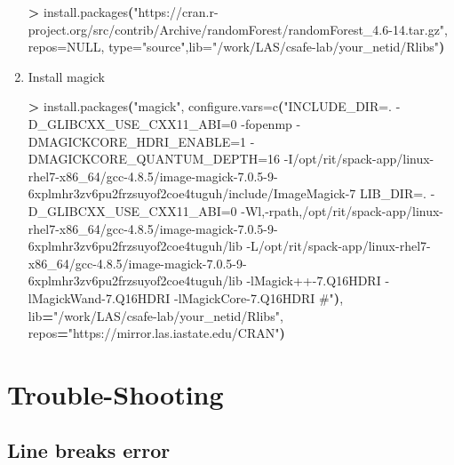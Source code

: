 \documentclass[
]{book}
\newenvironment{Shaded}{\begin{snugshade}}{\end{snugshade}}
\newcommand{\ErrorTok}[1]{\textcolor[rgb]{0.64,0.00,0.00}{\textbf{#1}}}
\newcommand{\ExtensionTok}[1]{#1}
\newcommand{\KeywordTok}[1]{\textcolor[rgb]{0.13,0.29,0.53}{\textbf{#1}}}
\newcommand{\NormalTok}[1]{#1}
\newcommand{\OperatorTok}[1]{\textcolor[rgb]{0.81,0.36,0.00}{\textbf{#1}}}
\newcommand{\StringTok}[1]{\textcolor[rgb]{0.31,0.60,0.02}{#1}}
\newcommand{\VariableTok}[1]{\textcolor[rgb]{0.00,0.00,0.00}{#1}}
\begin{document}
\begin{enumerate}
\begin{Shaded}
\begin{Highlighting}[]
\OperatorTok{\textgreater{}}\NormalTok{ install.packages}\KeywordTok{(}\StringTok{"https://cran.r{-}project.org/src/contrib/Archive/randomForest/randomForest\_4.6{-}14.tar.gz"}\ExtensionTok{,}\NormalTok{ repos=NULL, type=}\StringTok{"source"}\NormalTok{,lib=}\StringTok{"/work/LAS/csafe{-}lab/your\_netid/Rlibs"}\KeywordTok{)}
\end{Highlighting}
\end{Shaded}
\item
  Install magick

\begin{Shaded}
\begin{Highlighting}[]
\OperatorTok{\textgreater{}}\NormalTok{ install.packages}\KeywordTok{(}\StringTok{"magick"}\ExtensionTok{,} 
\ExtensionTok{configure.vars=c}\ErrorTok{(}\StringTok{"INCLUDE\_DIR=\textquotesingle{}. {-}D\_GLIBCXX\_USE\_CXX11\_ABI=0 {-}fopenmp {-}DMAGICKCORE\_HDRI\_ENABLE=1 {-}DMAGICKCORE\_QUANTUM\_DEPTH=16 {-}I/opt/rit/spack{-}app/linux{-}rhel7{-}x86\_64/gcc{-}4.8.5/image{-}magick{-}7.0.5{-}9{-}6xplmhr3zv6pu2frzsuyof2coe4tuguh/include/ImageMagick{-}7\textquotesingle{} LIB\_DIR=\textquotesingle{}. {-}D\_GLIBCXX\_USE\_CXX11\_ABI=0 {-}Wl,{-}rpath,/opt/rit/spack{-}app/linux{-}rhel7{-}x86\_64/gcc{-}4.8.5/image{-}magick{-}7.0.5{-}9{-}6xplmhr3zv6pu2frzsuyof2coe4tuguh/lib {-}L/opt/rit/spack{-}app/linux{-}rhel7{-}x86\_64/gcc{-}4.8.5/image{-}magick{-}7.0.5{-}9{-}6xplmhr3zv6pu2frzsuyof2coe4tuguh/lib {-}lMagick++{-}7.Q16HDRI {-}lMagickWand{-}7.Q16HDRI {-}lMagickCore{-}7.Q16HDRI \#\textquotesingle{}"}\KeywordTok{)}\ExtensionTok{,}
\VariableTok{lib}\OperatorTok{=}\StringTok{"/work/LAS/csafe{-}lab/your\_netid/Rlibs"}\NormalTok{,}
\VariableTok{repos}\OperatorTok{=}\StringTok{"https://mirror.las.iastate.edu/CRAN"}\KeywordTok{)}
\end{Highlighting}
\end{Shaded}
\end{enumerate}

\hypertarget{trouble-shooting-1}{%
\section{Trouble-Shooting}\label{trouble-shooting-1}}

\hypertarget{ex-line-breaks}{%
\subsection{Line breaks error}\label{ex-line-breaks}}
\end{document}
